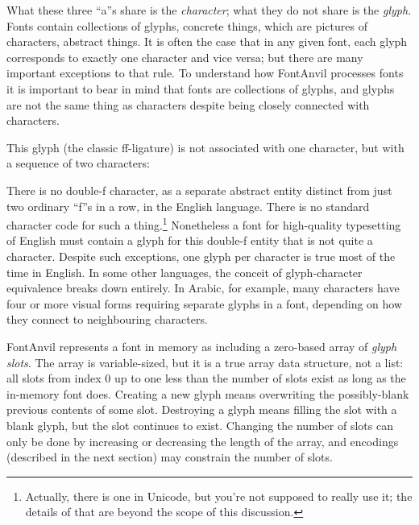 \begin{center}
\qquad
{}\qquad
{}
\end{center}

What these three ``a''s share is the \emph{character}; what they do not
share is the \emph{glyph}.  Fonts contain collections of glyphs, concrete
things, which are pictures of characters, abstract things.  It is often the
case that in any given font, each glyph corresponds to exactly one character
and vice versa; but there are many important exceptions to that rule.  To
understand how FontAnvil processes fonts it is important to bear in mind
that fonts are collections of glyphs, and glyphs are not the same thing as
characters despite being closely connected with characters.

This glyph (the classic ff-ligature) is not associated with one character,
but with a sequence of two characters:

\begin{center}
\end{center}

There is no double-f character, as a separate abstract entity distinct from
just two ordinary ``f''s in a row, in the English language.  There is no
standard character code for such a thing.\footnote{Actually, there is one in
Unicode, but you're not supposed to really use it; the details of that are
beyond the scope of this discussion.} Nonetheless a font for high-quality
typesetting of English must contain a glyph for this double-f entity
that is not quite a character.  Despite such exceptions, one glyph per
character is true most of the time in English.  In some other languages, the
conceit of glyph-character equivalence breaks down entirely.  In Arabic, for
example, many characters have four or more visual forms requiring
separate glyphs in a font, depending on how they connect to neighbouring
characters.

FontAnvil represents a font in memory as including a zero-based array of
\emph{glyph slots}.  The array is variable-sized, but it is a true array
data structure, not a list: all slots from index 0 up to one less than the
number of slots exist as long as the in-memory font does.  Creating a new
glyph means overwriting the possibly-blank previous contents of some slot. 
Destroying a glyph means filling the slot with a blank glyph, but the slot
continues to exist.  Changing the number of slots can only be done by
increasing or decreasing the length of the array, and encodings (described
in the next section) may constrain the number of slots.

